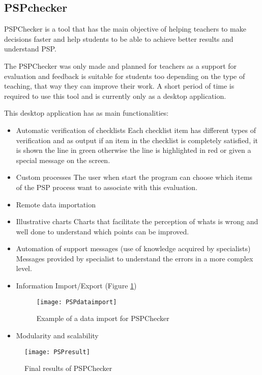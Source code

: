 \subsection{PSPchecker}

PSPChecker\citep{Pinto2010} is a tool that has the main objective of helping teachers to make decisions faster and help students to be able to achieve better results and understand PSP.

The PSPChecker was only made and planned for teachers as a support for evaluation and feedback is suitable for students too depending on the type of teaching, that way they can improve their work. A short period of time is required to use this tool and is currently only as a desktop application.


This desktop application has as main functionalities:
\begin{itemize}
	\item Automatic verification of checklists
	\subitem Each checklist item has different types of verification and as output if an item in the checklist is completely satisfied, it is shown the line in green otherwise the line is highlighted in red or given a special message on the screen.
	\item Custom processes
	\subitem The user when start the program can choose which items of the PSP process want to associate with this evaluation.
	\item Remote data importation
	\item Illustrative charts
	\subitem Charts that facilitate the perception of whats is wrong and well done to understand which points can be improved.
	\item Automation of support messages (use of knowledge acquired by specialists)
	\subitem Messages provided by specialist to understand the errors in a more complex level.
	\item Information Import/Export (Figure \ref{fig:PSPdataimport})
	\begin{figure}[h]
		\begin{center}
			\leavevmode
			\texttt{[image: PSPdataimport]}
			\caption{Example of a data import for PSPChecker}
			\label{fig:PSPdataimport}
		\end{center}
	\end{figure}
	\item Modularity and scalability
\end{itemize}

\begin{figure}[h]
	\begin{center}
		\leavevmode
		\texttt{[image: PSPresult]}
		\caption{Final results of PSPChecker}
		\label{fig:PSPresults}
	\end{center}
\end{figure}

